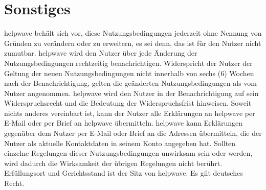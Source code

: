 \documentclass[10pt]{article}
\begin{document}
\section{Sonstiges}
helpwave behält sich vor, diese Nutzungsbedingungen jederzeit ohne Nennung von Gründen zu verändern oder zu erweitern,
es sei denn, das ist für den Nutzer nicht zumutbar. helpwave wird den Nutzer über jede Änderung der Nutzungsbedingungen rechtzeitig benachrichtigen. Widerspricht der Nutzer der Geltung der neuen Nutzungsbedingungen nicht innerhalb von
sechs (6) Wochen nach der Benachrichtigung, gelten die geänderten Nutzungsbedingungen als vom Nutzer angenommen.
helpwave wird den Nutzer in der Benachrichtigung auf sein Widerspruchsrecht und die Bedeutung der Widerspruchsfrist
hinweisen.
Soweit nichts anderes vereinbart ist, kann der Nutzer alle Erklärungen an helpwave per E-Mail oder per Brief an helpwave
übermitteln. helpwave kann Erklärungen gegenüber dem Nutzer per E-Mail oder Brief an die Adressen übermitteln, die der
Nutzer als aktuelle Kontaktdaten in seinem Konto angegeben hat.
Sollten einzelne Regelungen dieser Nutzungsbedingungen unwirksam sein oder werden, wird dadurch die Wirksamkeit der
übrigen Regelungen nicht berührt. \\
Erfüllungsort und Gerichtsstand ist der Sitz von helpwave.
Es gilt deutsches Recht.
\end{document}
